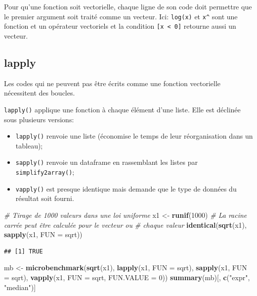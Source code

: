 \documentclass[
  12pt,
  french,
  a4paper,
  extrafontsizes,onecolumn,openright
  ]{memoir}
\newenvironment{Shaded}{\begin{snugshade}}{\end{snugshade}}
\newcommand{\CommentTok}[1]{\textcolor[rgb]{0.56,0.35,0.01}{\textit{#1}}}
\newcommand{\DataTypeTok}[1]{\textcolor[rgb]{0.13,0.29,0.53}{#1}}
\newcommand{\DecValTok}[1]{\textcolor[rgb]{0.00,0.00,0.81}{#1}}
\newcommand{\KeywordTok}[1]{\textcolor[rgb]{0.13,0.29,0.53}{\textbf{#1}}}
\newcommand{\NormalTok}[1]{#1}
\newcommand{\StringTok}[1]{\textcolor[rgb]{0.31,0.60,0.02}{#1}}
\providecommand{\tightlist}{%
  \setlength{\itemsep}{0pt}\setlength{\parskip}{0pt}}
\begin{document}
\normalsize

Pour qu'une fonction soit vectorielle, chaque ligne de son code doit permettre que le premier argument soit traité comme un vecteur.
Ici: \texttt{log(x)} et \texttt{x\^{}} sont une fonction et un opérateur vectoriels et la condition \texttt{{[}x\ \textless{}\ 0{]}} retourne aussi un vecteur.

\hypertarget{lapply}{%
\subsection{lapply}\label{lapply}}

Les codes qui ne peuvent pas être écrits comme une fonction vectorielle nécessitent des boucles.

\texttt{lapply()} applique une fonction à chaque élément d'une liste.
Elle est déclinée sous plusieurs versions:

\begin{itemize}
\tightlist
\item
  \texttt{lapply()} renvoie une liste (économise le temps de leur réorganisation dans un tableau);
\item
  \texttt{sapply()} renvoie un dataframe en rassemblant les listes par \texttt{simplify2array()};
\item
  \texttt{vapply()} est presque identique mais demande que le type de données du résultat soit fourni.
\end{itemize}

\scriptsize

\begin{Shaded}
\begin{Highlighting}[]
\CommentTok{# Tirage de 1000 valeurs dans une loi uniforme}
\NormalTok{x1 <-}\StringTok{ }\KeywordTok{runif}\NormalTok{(}\DecValTok{1000}\NormalTok{)}
\CommentTok{# La racine carrée peut être calculée pour le vecteur ou}
\CommentTok{# chaque valeur}
\KeywordTok{identical}\NormalTok{(}\KeywordTok{sqrt}\NormalTok{(x1), }\KeywordTok{sapply}\NormalTok{(x1, }\DataTypeTok{FUN =}\NormalTok{ sqrt))}
\end{Highlighting}
\end{Shaded}

\begin{verbatim}
## [1] TRUE
\end{verbatim}

\begin{Shaded}
\begin{Highlighting}[]
\NormalTok{mb <-}\StringTok{ }\KeywordTok{microbenchmark}\NormalTok{(}\KeywordTok{sqrt}\NormalTok{(x1), }\KeywordTok{lapply}\NormalTok{(x1, }\DataTypeTok{FUN =}\NormalTok{ sqrt), }\KeywordTok{sapply}\NormalTok{(x1,}
    \DataTypeTok{FUN =}\NormalTok{ sqrt), }\KeywordTok{vapply}\NormalTok{(x1, }\DataTypeTok{FUN =}\NormalTok{ sqrt, }\DataTypeTok{FUN.VALUE =} \DecValTok{0}\NormalTok{))}
\KeywordTok{summary}\NormalTok{(mb)[, }\KeywordTok{c}\NormalTok{(}\StringTok{"expr"}\NormalTok{, }\StringTok{"median"}\NormalTok{)]}
\end{Highlighting}
\end{Shaded}
\end{document}
